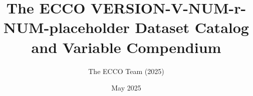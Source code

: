 \pagestyle{myfancy}

\title{The ECCO VERSION-V-NUM-r-NUM-placeholder Dataset Catalog and Variable Compendium}
\author{The ECCO Team (2025)}
\date {May 2025}

\renewcommand{\headrulewidth}{0pt}


\setlength{\headheight}{20.98703pt}
\addtolength{\topmargin}{-8.98703pt}

\renewcommand{\cellalign}{tl}

